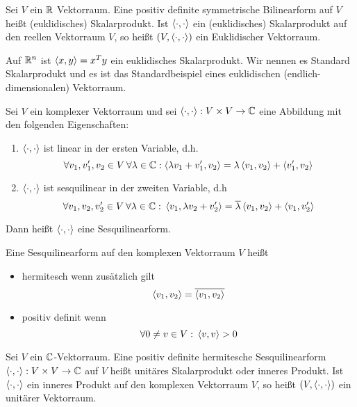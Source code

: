 \newcommand{\stdscp}{\ensuremath{\scp{\cdot,\cdot}}}
\newcommand{\fuer}{\ensuremath{\text{ für }}}
\newcommand{\KeRoC}{(\K = \R \smallspace \lor \smallspace\K = \C)}
\begin{definition}
    Sei $V$ ein $\mathbb{R}$ Vektorraum. Eine positiv definite symmetrische Bilinearform
    auf $V$ heißt (euklidisches) Skalarprodukt. Ist $\stdscp$ ein 
    (euklidisches) Skalarprodukt auf den reellen Vektorraum $V$, so heißt $(V, 
    \stdscp)$ ein Euklidischer Vektorraum.
\end{definition}
\begin{example}
    Auf $\mathbb{R}^n$ ist $\left<x,y\right> = x^T y$ ein euklidisches Skalarprodukt. Wir 
    nennen es Standard Skalarprodukt und es ist das Standardbeispiel eines 
    euklidischen (endlich-dimensionalen) Vektorraum.
\end{example}
\begin{definition}
    Sei $V$ ein komplexer Vektorraum und sei $\stdscp: V\times V\to
    \C$ eine Abbildung mit den folgenden Eigenschaften:\begin{enumerate}
        \item $\stdscp$ ist linear in der ersten Variable, d.h. \[
            \forall v_1, v_1', v_2 \in V \hspace{.2em}\forall \lambda \in \mathbb{C}: 
            \left<\lambda v_1 + v_1', v_2\right> = \lambda\left<v_1, v_2\right> + \left<v_1',
             v_2\right>\]
        \item $\stdscp$ ist sesquilinear in der zweiten Variable, d.h
            \[
                \forall v_1, v_2, v_2' \in V \hspace{.2em} \forall \lambda \in \mathbb{C}
                : \hspace{.2em} \left<v_1, \lambda v_2 + v_2'\right> = \overline{\lambda}
                \left<v_1, v_2\right> + \left<v_1, v_2'\right>\]
    \end{enumerate}
    Dann heißt $\stdscp$ eine Sesquilinearform.
\end{definition}
\begin{definition}
    Eine Sesquilinearform auf den komplexen Vektorraum $V$ heißt\begin{itemize}
        \item hermitesch wenn zusätzlich gilt\[
            \left<v_1, v_2\right> = \overline{\left<v_1,v_2\right>}\]
        \item positiv definit wenn \[
            \forall 0 \neq v \in V: \hspace{.2em} \left<v,v\right> > 0\]
    \end{itemize}
\end{definition}
\begin{definition}
    Sei $V$ ein $\mathbb{C}$-Vektorraum. Eine positiv definite hermitesche 
    Sesquilinearform $\stdscp:V\times V\to \C$ auf $V$ heißt unitäres
    Skalarprodukt oder inneres Produkt. Ist $\stdscp$ ein inneres Produkt auf 
    den komplexen Vektorraum $V$, so heißt $(V, \stdscp)$ ein unitärer 
    Vektorraum.
\end{definition}
